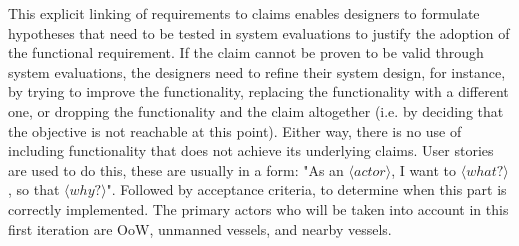 This explicit linking of requirements to claims enables designers to formulate hypotheses that need to be tested in system evaluations to justify the adoption of the functional requirement. If the claim cannot be proven to be valid through system evaluations, the designers need to refine their system design, for instance, by trying to improve the functionality, replacing the functionality with a different one, or dropping the functionality and the claim altogether (i.e. by deciding that the objective is not reachable at this point). Either way, there is no use of including functionality that does not achieve its underlying claims. User stories are used to do this, these are usually in a form: "As an $\langle actor \rangle$, I want to $\langle what? \rangle$, so that $\langle why? \rangle$". Followed by acceptance criteria, to determine when this part is correctly implemented.
The primary actors who will be taken into account in this first iteration are \acf{OoW}, unmanned vessels, and nearby vessels.

